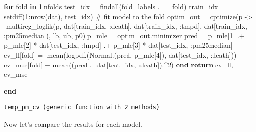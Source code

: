 \documentclass[
  letterpaper,
  DIV=11,
  numbers=noendperiod]{scrartcl}
\newenvironment{Shaded}{\begin{snugshade}}{\end{snugshade}}
\newcommand{\CommentTok}[1]{\textcolor[rgb]{0.37,0.37,0.37}{#1}}
\newcommand{\ControlFlowTok}[1]{\textcolor[rgb]{0.00,0.23,0.31}{\textbf{#1}}}
\newcommand{\FloatTok}[1]{\textcolor[rgb]{0.68,0.00,0.00}{#1}}
\newcommand{\FunctionTok}[1]{\textcolor[rgb]{0.28,0.35,0.67}{#1}}
\newcommand{\KeywordTok}[1]{\textcolor[rgb]{0.00,0.23,0.31}{\textbf{#1}}}
\newcommand{\NormalTok}[1]{\textcolor[rgb]{0.00,0.23,0.31}{#1}}
\newcommand{\OperatorTok}[1]{\textcolor[rgb]{0.37,0.37,0.37}{#1}}
\newcommand*\circled[1]{\tikz[baseline=(char.base)]{
          \node[shape=circle,draw,inner sep=1pt] (char) {{\scriptsize#1}};}}
\begin{document}
\begin{Shaded}
\begin{Highlighting}[]
    \ControlFlowTok{for}\NormalTok{ fold }\KeywordTok{in} \FloatTok{1}\OperatorTok{:}\NormalTok{nfolds}
\NormalTok{        test\_idx }\OperatorTok{=} \FunctionTok{findall}\NormalTok{(fold\_labels }\OperatorTok{.==}\NormalTok{ fold)}
\NormalTok{        train\_idx }\OperatorTok{=} \FunctionTok{setdiff}\NormalTok{(}\FloatTok{1}\OperatorTok{:}\FunctionTok{nrow}\NormalTok{(dat), test\_idx)}
        \CommentTok{\# fit model to the fold}
\NormalTok{        optim\_out }\OperatorTok{=} \FunctionTok{optimize}\NormalTok{(p }\OperatorTok{{-}\textgreater{}} \FunctionTok{{-}multireg\_loglik}\NormalTok{(p, dat[train\_idx, }\OperatorTok{:}\NormalTok{death], dat[train\_idx, }\OperatorTok{:}\NormalTok{tmpd], dat[train\_idx, }\OperatorTok{:}\NormalTok{pm25median]), lb, ub, p0)}
\NormalTok{        p\_mle }\OperatorTok{=}\NormalTok{ optim\_out.minimizer}
\NormalTok{        pred }\OperatorTok{=}\NormalTok{ p\_mle[}\FloatTok{1}\NormalTok{] }\OperatorTok{.+}\NormalTok{ p\_mle[}\FloatTok{2}\NormalTok{] }\OperatorTok{*}\NormalTok{ dat[test\_idx, }\OperatorTok{:}\NormalTok{tmpd] }\OperatorTok{.+}\NormalTok{ p\_mle[}\FloatTok{3}\NormalTok{] }\OperatorTok{*}\NormalTok{ dat[test\_idx, }\OperatorTok{:}\NormalTok{pm25median]}
\NormalTok{        cv\_ll[fold] }\OperatorTok{=} \FunctionTok{{-}mean}\NormalTok{(}\FunctionTok{logpdf}\NormalTok{.(}\FunctionTok{Normal}\NormalTok{.(pred, p\_mle[}\FloatTok{4}\NormalTok{]), dat[test\_idx, }\OperatorTok{:}\NormalTok{death])) }\hspace*{\fill}\NormalTok{\circled{2}}
\NormalTok{        cv\_mse[fold] }\OperatorTok{=} \FunctionTok{mean}\NormalTok{((pred }\OperatorTok{.{-}}\NormalTok{ dat[test\_idx, }\OperatorTok{:}\NormalTok{death])}\OperatorTok{.\^{}}\FloatTok{2}\NormalTok{)}
    \ControlFlowTok{end}
    \ControlFlowTok{return}\NormalTok{ cv\_ll, cv\_mse}

\KeywordTok{end}
\end{Highlighting}
\end{Shaded}

\begin{verbatim}
temp_pm_cv (generic function with 2 methods)
\end{verbatim}

Now let's compare the results for each model.
\end{document}
